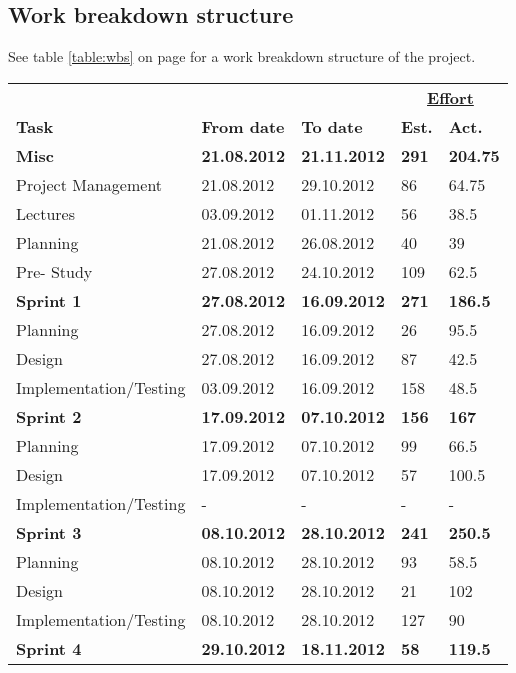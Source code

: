 \subsection{Work breakdown structure}

See table \ref{table:wbs} on page \pageref{table:wbs} for a work breakdown structure of the project.

\begin{table}
\begin{center}

\begin{tabular}{ l|l|l|l|l } \hline
&	 &	 &\multicolumn{2}{c}{\underline{\textbf{Effort}}}	 \\
\textbf{Task}	 & \textbf{From date}	 & \textbf{To date}	 & \textbf{Est.} & \textbf{Act.}	 \\ \hline \hline
\textbf{Misc} & \textbf{21.08.2012} & \textbf{21.11.2012} & \textbf{291} & \textbf{204.75} \\ \hline
Project Management & 21.08.2012 & 29.10.2012 & 86 & 64.75 \\
Lectures & 03.09.2012 & 01.11.2012 & 56 & 38.5\\
Planning & 21.08.2012 & 26.08.2012 & 40 & 39 \\
Pre- Study &27.08.2012  & 24.10.2012 & 109 & 62.5\\ \hline
\bf{Sprint 1}	&\bf{27.08.2012} & \bf{16.09.2012} & \bf{271} & \textbf{186.5} \\ \hline
Planning & 27.08.2012 & 16.09.2012 & 26 & 95.5 \\
Design & 27.08.2012 & 16.09.2012 & 87 & 42.5\\
Implementation/Testing & 03.09.2012 & 16.09.2012 & 158 & 48.5\\ \hline
\bf{Sprint 2} & \bf{17.09.2012} & \bf{07.10.2012} & \bf{156} & \textbf{167} \\ \hline
Planning & 17.09.2012 & 07.10.2012 & 99 & 66.5\\
Design& 17.09.2012 & 07.10.2012 & 57 & 100.5\\
Implementation/Testing & - & - & - & -\\ \hline
\bf{Sprint 3}	 & \bf{08.10.2012} & \bf{28.10.2012} & \bf{241} & \textbf{250.5}\\ \hline
Planning & 08.10.2012 & 28.10.2012 & 93 & 58.5 \\
Design & 08.10.2012 & 28.10.2012 & 21 & 102\\
Implementation/Testing & 08.10.2012 & 28.10.2012 & 127 & 90\\ \hline
\bf{Sprint 4}	& \bf{29.10.2012} & \bf{18.11.2012} & \bf{58}  & \bf{119.5}  \\ \hline

\end{tabular}
\end{center}
\end{table}
